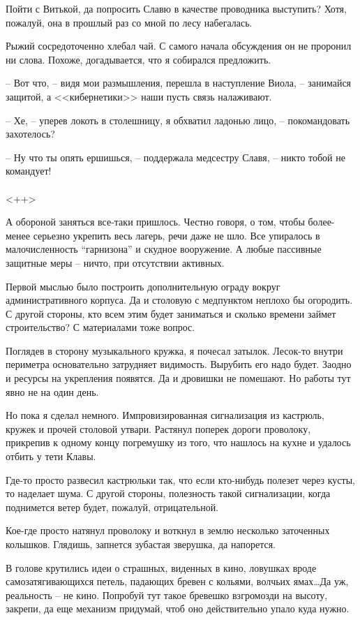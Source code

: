 \documentclass[a4paper]{book}
\begin{document}
Пойти с Витькой, да попросить Славю в качестве проводника выступить? Хотя, пожалуй, она в прошлый раз со мной по лесу набегалась. 

Рыжий сосредоточенно хлебал чай. С самого начала обсуждения он не проронил ни слова. Похоже, догадывается, что я собирался предложить.

-- Вот что, -- видя мои размышления, перешла в наступление Виола, -- занимайся защитой, а <<кибернетики>> наши пусть связь налаживают. 

-- Хе, -- уперев локоть в столешницу, я обхватил ладонью лицо, -- покомандовать захотелось?

-- Ну что ты опять ершишься, -- поддержала медсестру Славя, -- никто тобой не командует! 

\paragraph{}<++>

А обороной заняться все-таки пришлось. Честно говоря, о том, чтобы более-менее серьезно укрепить весь лагерь, речи даже не шло. Все упиралось в малочисленность ``гарнизона'' и скудное вооружение. А любые пассивные защитные меры -- ничто, при отсутствии активных. 

Первой мыслью было построить дополнительную ограду вокруг административного корпуса.  Да и столовую с медпунктом неплохо бы огородить. С другой стороны, кто всем этим будет заниматься и сколько времени займет строительство? С материалами тоже вопрос. 

Поглядев в сторону музыкального кружка, я почесал затылок. Лесок-то внутри периметра основательно затрудняет видимость. Вырубить его надо будет. Заодно и ресурсы на укрепления появятся. Да и дровишки не помешают. Но работы тут явно не на один день. 

Но пока я сделал немного. Импровизированная сигнализация из кастрюль, кружек и прочей столовой утвари. Растянул поперек дороги проволоку, прикрепив к одному концу погремушку из того, что нашлось на кухне и удалось отбить у тети Клавы. 

Где-то просто развесил кастрюльки так, что если кто-нибудь полезет через кусты, то наделает шума. С другой стороны, полезность такой сигнализации, когда поднимется ветер будет, пожалуй, отрицательной.

Кое-где просто натянул проволоку и воткнул в землю несколько заточенных колышков. Глядишь, запнется зубастая зверушка, да напорется. 

В голове крутились идеи о страшных, виденных в кино, ловушках вроде самозатягивающихся петель, падающих бревен с кольями, волчьих ямах\ldots Да уж, реальность -- не кино. Попробуй тут такое бревешко взгромозди на высоту, закрепи, да еще механизм придумай, чтоб оно действительно упало куда нужно.
\end{document}
